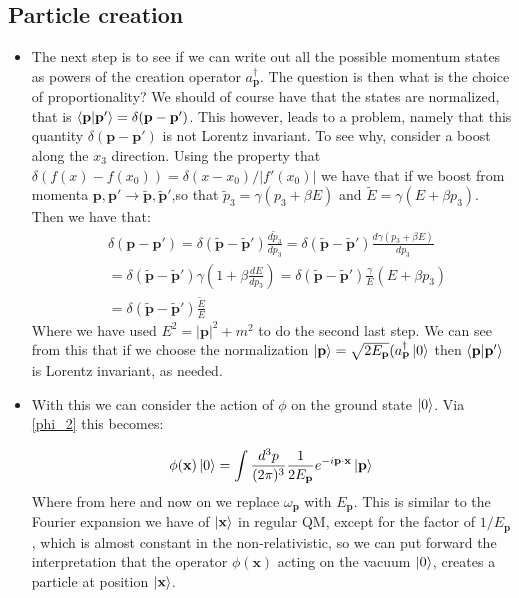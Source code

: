 \documentclass[11pt]{article}
\numberwithin{equation}{section}
\begin{document}
\subsection{Particle creation}
\begin{itemize}
\item The next step is to see if we can write out all the possible momentum states as powers of the creation operator $a^{\dagger}_{\textbf{p}}$. The question is then what is the choice of proportionality? We should of course have that the states are normalized, that is $\braket{\textbf{p}|\textbf{p}'} = \delta(\textbf{p}-\textbf{p}')$. This however, leads to a problem, namely that this quantity $\delta(\textbf{p}-\textbf{p}')$ is not Lorentz invariant. To see why, consider a boost along the $x_3$ direction. Using the property that $\delta(f(x)-f(x_0)) = \delta(x-x_0)/|f'(x_0)|$ we have that if we boost from momenta $\textbf{p},\textbf{p}' \rightarrow \tilde{\textbf{p}},\tilde{\textbf{p}}'$,so that $\tilde{p}_3 = \gamma(p_3+\beta E)$ and $\tilde{E} = \gamma(E + \beta p_3)$. Then we have that: 
\begin{equation*}
  \begin{split}
   &  \delta(\textbf{p}-\textbf{p}') = \delta(\tilde{\textbf{p}}-\tilde{\textbf{p}}') \frac{d \tilde{p}_3}{d p_3}  = \delta(\tilde{\textbf{p}}-\tilde{\textbf{p}}') \frac{d \gamma(p_3+\beta E)}{dp_3} \\
    &  =   \delta(\tilde{\textbf{p}}-\tilde{\textbf{p}}')\gamma \left(1 + \beta\frac{d E}{dp_3}\right)  =  \delta(\tilde{\textbf{p}}-\tilde{\textbf{p}}')\frac{\gamma}{E} \left(E + \beta p_3\right) \\
    & =  \delta(\tilde{\textbf{p}}-\tilde{\textbf{p}}')\frac{\tilde{E}}{E} 
  \end{split}
\end{equation*}
Where we have used $E^2 = |\textbf{p}|^2+m^2$ to do the second last step. We can see from this that if we choose the normalization $\ket{\textbf{p}} = \sqrt{2E_{\textbf{p}}}(a^{\dagger}_{\textbf{p}}\ket{0}$ then $\braket{\textbf{p}|\textbf{p}'}$ is Lorentz invariant, as needed. 

\item With this we can consider the action of $\phi$ on the ground state $\ket{0}$. Via \ref{phi_2} this becomes: 

\[
  \phi(\textbf{x})\ket{0} = \int \frac{d^3p}{(2\pi)^3}\frac{1}{2E_{\textbf{p}}}e^{-i\textbf{p}\cdot \textbf{x}}\ket{\textbf{p}} 
\]
Where from here and now on we replace $\omega_{\textbf{p}}$ with $E_{\textbf{p}}$. This is similar to the Fourier expansion we have of $\ket{\textbf{x}}$ in regular QM, except for the factor of $1/E_{\textbf{p}}$, which is almost constant in the non-relativistic, so we can put forward the interpretation that the operator $\phi(\textbf{x})$ acting on the vacuum $\ket{0}$, creates a particle at position $\ket{\textbf{x}}$. 
\end{itemize}
\end{document}
